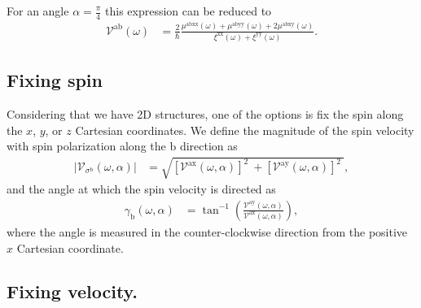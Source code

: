 \documentclass[prb,11pt,tightenlines,twocolumn,aps]{revtex4-1}
\begin{document}
For an angle $\alpha = \frac{\pi}{4}$ this expression can be reduced to 
\begin{align}
\mathcal{V}^{\mathrm{ab}} (\omega)
&= \frac{2}{\hbar}
\frac{\mu^{\mathrm{abxx}}(\omega) + \mu^{\mathrm{abyy}}(\omega) + 
2\mu^{\mathrm{abxy}}(\omega)}
{\xi^{\mathrm{xx}}(\omega) + \xi^{\mathrm{yy}}(\omega)}.
\label{eq:vab-90deg}
\end{align}




\subsection{Fixing spin}\label{sec:theory-fixspin}
Considering that we have 2D structures, one of the options is fix the spin along
the $x$, $y$, or $z$ Cartesian coordinates. We define the magnitude of the spin
velocity with spin polarization along the $\mathrm{b}$ direction as 
\begin{align}
|\mathcal{V}_{\sigma^{\mathrm{b}}}(\omega,\alpha)| 
&=
\sqrt{
[\mathcal{V}^{\mathrm{ax}}(\omega,\alpha)]^{2}\ +
[\mathcal{V}^{\mathrm{ay}}(\omega,\alpha)]^{2}\ 
}, 
\label{eq:vs-mag}
\end{align}
and the angle at which the spin velocity is directed as
\begin{align}
\gamma_{\mathrm{b}} (\omega,\alpha)
&=
\tan^{-1} \left( \frac{\mathcal{V}^{\mathrm{ay}}(\omega,\alpha)}
{\mathcal{V}^{\mathrm{ax}}(\omega,\alpha)} \right),
\label{eq:gamma-ang}
\end{align}
where the angle is measured in the counter-clockwise direction from the positive
$x$ Cartesian coordinate.




\subsection{Fixing velocity.}\label{sec:theory-fixvel}
\end{document}
